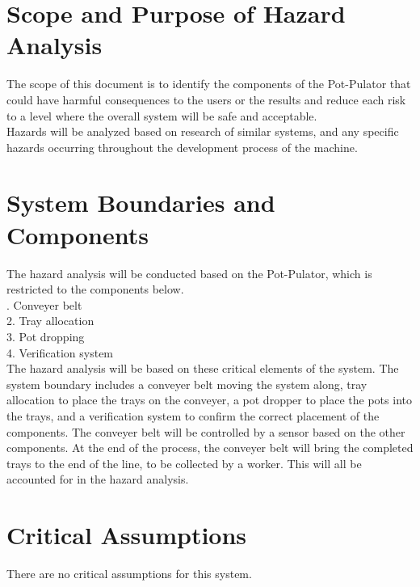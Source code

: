\documentclass{article}
\begin{document}
\section{Scope and Purpose of Hazard Analysis}

\noindent The scope of this document is to identify the components of the Pot-Pulator that could have harmful consequences to the users or the results and reduce each risk to a level where the overall system will be safe and acceptable. 
\\

\noindent Hazards will be analyzed based on research of similar systems, and any specific hazards occurring throughout the development process of the machine. 

\section{System Boundaries and Components}

The hazard analysis will be conducted based on the Pot-Pulator, which is restricted to the components below. 
\\

. Conveyer belt
\\

2.	Tray allocation
\\

3.	Pot dropping
\\

4.	Verification system
\\

\noindent The hazard analysis will be based on these critical elements of the system. The system boundary includes a conveyer belt moving the system along, tray allocation to place the trays on the conveyer, a pot dropper to place the pots into the trays, and a verification system to confirm the correct placement of the components. 
\clearpage
\noindent The conveyer belt will be controlled by a sensor based on the other components. At the end of the process, the conveyer belt will bring the completed trays to the end of the line, to be collected by a worker. This will all be accounted for in the hazard analysis. 

\section{Critical Assumptions}

There are no critical assumptions for this system.
\end{document}

